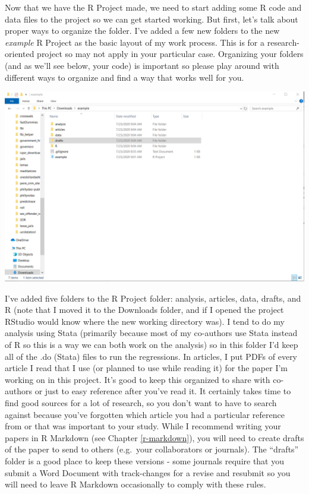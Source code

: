 \documentclass[
  12pt,
]{book}
\begin{document}
Now that we have the R Project made, we need to start adding some R code and data files to the project so we can get started working. But first, let's talk about proper ways to organize the folder. I've added a few new folders to the new \emph{example} R Project as the basic layout of my work process. This is for a research-oriented project so may not apply in your particular case. Organizing your folders (and as we'll see below, your code) is important so please play around with different ways to organize and find a way that works well for you.

\includegraphics{images/new_project_7.PNG}

I've added five folders to the R Project folder: analysis, articles, data, drafts, and R (note that I moved it to the Downloads folder, and if I opened the project RStudio would know where the new working directory was). I tend to do my analysis using Stata (primarily because most of my co-authors use Stata instead of R so this is a way we can both work on the analysis) so in this folder I'd keep all of the .do (Stata) files to run the regressions. In articles, I put PDFs of every article I read that I use (or planned to use while reading it) for the paper I'm working on in this project. It's good to keep this organized to share with co-authors or just to easy reference after you've read it. It certainly takes time to find good sources for a lot of research, so you don't want to have to search against because you've forgotten which article you had a particular reference from or that was important to your study. While I recommend writing your papers in R Markdown (see Chapter \ref{r-markdown}), you will need to create drafts of the paper to send to others (e.g.~your collaborators or journals). The ``drafts'' folder is a good place to keep these versions - some journals require that you submit a Word Document with track-changes for a revise and resubmit so you will need to leave R Markdown occasionally to comply with these rules.
\end{document}
